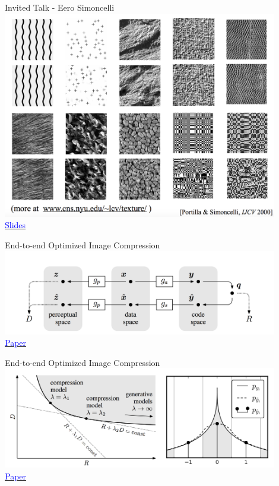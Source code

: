 \documentclass[]{beamer}
\begin{document}
\begin{frame}{Invited Talk - Eero Simoncelli}
\centering
\includegraphics[width=0.9\textwidth]{figures/simoncelli-texture-synthesis-examples} \\
\href{http://iclr.cc/lib/exe/fetch.php?media=iclr2017:simoncelli\_iclr2017.pdf}{\textcolor{blue}{Slides}}
\end{frame}

\begin{frame}{End-to-end Optimized Image Compression}
\centering
\includegraphics[width=0.9\textwidth]{figures/balle-framework} \\
\href{https://openreview.net/forum?id=rJxdQ3jeg&noteId=rJxdQ3jeg}{\textcolor{blue}{Paper}}
\end{frame}

\begin{frame}{End-to-end Optimized Image Compression}
\centering
\includegraphics[width=0.9\textwidth]{figures/balle-tradeoff} \\
\href{https://openreview.net/forum?id=rJxdQ3jeg&noteId=rJxdQ3jeg}{\textcolor{blue}{Paper}}
\end{frame}
\end{document}

